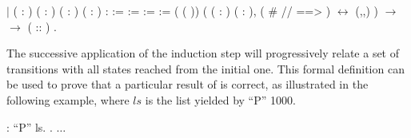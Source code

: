 \begin{coqdoccode}
	\ensuremath{|} \coqdoceol
	\coqdocindent{4.00em}
	( : )\coqdoceol
	\coqdocindent{4.00em}
	( :  )\coqdoceol
	\coqdocindent{4.00em}
	( : )\coqdoceol
	\coqdocindent{4.00em}
	(  :  ) :\coqdoceol
	\coqdocindent{3.00em}
	  :=    \coqdoceol
	\coqdocindent{3.00em}
	  :=     \coqdoceol
	\coqdocindent{3.00em}
	  :=     \coqdoceol
	\coqdocindent{3.00em}
	  :=  \coqdoceol
	\coqdocindent{12.00em}
	(   ( ))\coqdoceol
	\coqdocindent{12.00em}
	 \coqdoceol
	\coqdocindent{3.00em}
	(\coqdockw{\ensuremath{\forall}} ( : ) ( : ),\coqdoceol
	\coqdocindent{4.50em}
	( \#  //  ==> ) \ensuremath{\leftrightarrow}  (,,) ) \ensuremath{\rightarrow}\coqdoceol
	\coqdocindent{3.00em}
	     \ensuremath{\rightarrow}\coqdoceol
	\coqdocindent{3.00em}
	   ( :: ) .\coqdoceol
\end{coqdoccode}

The successive application of the induction step will progressively relate a set of transitions with all states reached from the initial one. This formal definition can be used to prove that a particular result of  is correct, as illustrated in the following example, where $ls$ is the list yielded by   ``P'' 1000.

\begin{coqdoccode}
	\coqdocnoindent
	  :\coqdoceol
	\coqdocindent{1.00em}
	  ``P'' ls.\coqdoceol
	\coqdocnoindent
	. $\ldots$ \coqdoceol
\end{coqdoccode}

